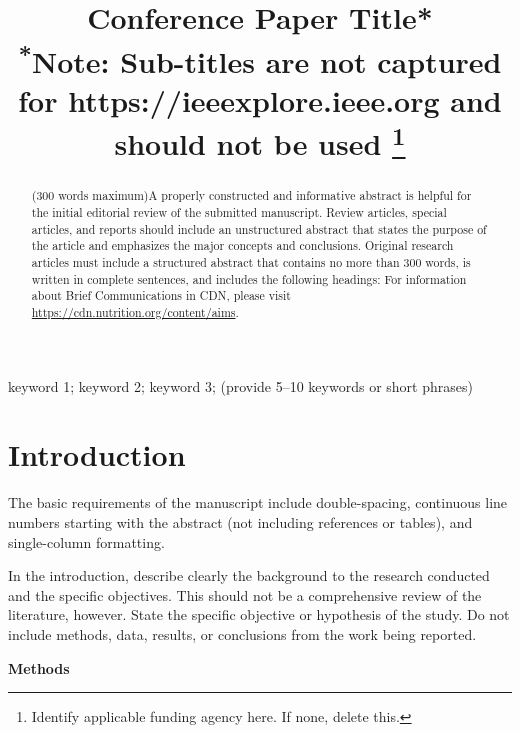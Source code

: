 \documentclass[conference]{IEEEtran}
\begin{document}
\title{Conference Paper Title*\\
{\footnotesize \textsuperscript{*}Note: Sub-titles are not captured for https://ieeexplore.ieee.org  and
should not be used}
\thanks{Identify applicable funding agency here. If none, delete this.}
}



\maketitle

\begin{abstract}
(300 words maximum)A properly constructed and informative abstract is helpful for the initial editorial review of the submitted manuscript. Review articles, special articles, and reports should include an unstructured abstract that states the purpose of the article and emphasizes the major concepts and conclusions. Original research articles must include a structured abstract that contains no more than 300 words, is written in complete sentences, and includes the following headings: For information about Brief Communications in CDN, please visit \url{https://cdn.nutrition.org/content/aims}.
\end{abstract}

\begin{IEEEkeywords}
keyword 1; keyword 2; keyword 3; (provide 5--10 keywords or short phrases)
\end{IEEEkeywords}

\section*{\textbf{Introduction}}

The basic requirements of the manuscript include double-spacing, continuous line numbers starting with the abstract (not including references or tables), and single-column formatting. 

In the introduction, describe clearly the background to the research conducted and the specific objectives. This should not be a comprehensive review of the literature, however. State the specific objective or hypothesis of the study. Do not include methods, data, results, or conclusions from the work being reported.

\textbf{Me}\textbf{thods}
\end{document}
